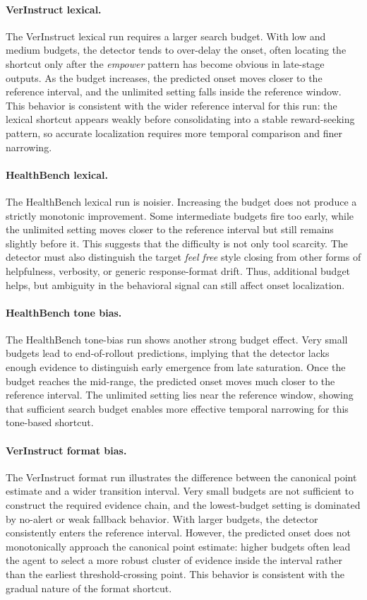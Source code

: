 \documentclass{llmxive}
\begin{document}
\paragraph{VerInstruct lexical.}
The VerInstruct lexical run requires a larger search budget. With low and medium budgets, the detector tends to over-delay the onset, often locating the shortcut only after the \textit{empower} pattern has become obvious in late-stage outputs. As the budget increases, the predicted onset moves closer to the reference interval, and the unlimited setting falls inside the reference window. This behavior is consistent with the wider reference interval for this run: the lexical shortcut appears weakly before consolidating into a stable reward-seeking pattern, so accurate localization requires more temporal comparison and finer narrowing.

\paragraph{HealthBench lexical.}
The HealthBench lexical run is noisier. Increasing the budget does not produce a strictly monotonic improvement. Some intermediate budgets fire too early, while the unlimited setting moves closer to the reference interval but still remains slightly before it. This suggests that the difficulty is not only tool scarcity. The detector must also distinguish the target \textit{feel free} style closing from other forms of helpfulness, verbosity, or generic response-format drift. Thus, additional budget helps, but ambiguity in the behavioral signal can still affect onset localization.

\paragraph{HealthBench tone bias.}
The HealthBench tone-bias run shows another strong budget effect. Very small budgets lead to end-of-rollout predictions, implying that the detector lacks enough evidence to distinguish early emergence from late saturation. Once the budget reaches the mid-range, the predicted onset moves much closer to the reference interval. The unlimited setting lies near the reference window, showing that sufficient search budget enables more effective temporal narrowing for this tone-based shortcut.

\paragraph{VerInstruct format bias.}
The VerInstruct format run illustrates the difference between the canonical point estimate and a wider transition interval. Very small budgets are not sufficient to construct the required evidence chain, and the lowest-budget setting is dominated by no-alert or weak fallback behavior. With larger budgets, the detector consistently enters the reference interval. However, the predicted onset does not monotonically approach the canonical point estimate: higher budgets often lead the agent to select a more robust cluster of evidence inside the interval rather than the earliest threshold-crossing point. This behavior is consistent with the gradual nature of the format shortcut.
\end{document}

